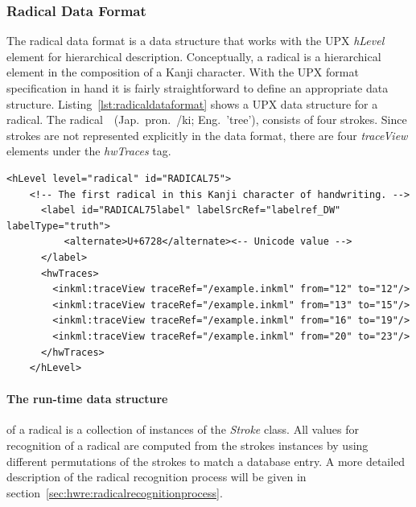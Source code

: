 \subsubsection{Radical Data Format}
\label{sec:hwre:radicaldataformat}

The radical data format is a data structure that works with the UPX \emph{hLevel}
element for hierarchical description.
Conceptually, a radical is a hierarchical element in the composition of a Kanji
character. With the UPX format specification in hand it is fairly 
straightforward to define an appropriate data structure.
Listing~\ref{lst:radicaldataformat} shows a UPX data structure for a radical.
The 
radical~~(Jap.\ pron.\ /ki; Eng.\ 'tree'), 
consists of four strokes.
Since strokes are not represented explicitly in the data format,
there are four \emph{traceView} elements under the \emph{hwTraces} tag.
\newpage
\begin{xmlcode}
  \begin{lstlisting}[emph={hLevel,hwTraces,label,alternative},
                     emphstyle=\color{blue}\textbf,
                     emph={[2]level,labelSrcRef,labelType,traceRef,from,to},
                     emphstyle={[2]\color{red}},
                     caption={A radical representation in UPX},
                     label=lst:radicaldataformat]
    <hLevel level="radical" id="RADICAL75">
    <!-- The first radical in this Kanji character of handwriting. -->
      <label id="RADICAL75label" labelSrcRef="labelref_DW" labelType="truth">
          <alternate>U+6728</alternate><-- Unicode value -->
      </label>
      <hwTraces>
        <inkml:traceView traceRef="/example.inkml" from="12" to="12"/>
        <inkml:traceView traceRef="/example.inkml" from="13" to="15"/>
        <inkml:traceView traceRef="/example.inkml" from="16" to="19"/>
        <inkml:traceView traceRef="/example.inkml" from="20" to="23"/>
      </hwTraces>
    </hLevel>
  \end{lstlisting}
\end{xmlcode}

\paragraph{The run-time data structure} of a radical is a collection of instances
of the \emph{Stroke} class.
All values for recognition of a radical are computed from the strokes instances
by using different permutations of the strokes to match a database entry. A more
detailed description of the radical recognition process will be given in
section~\ref{sec:hwre:radicalrecognitionprocess}.

